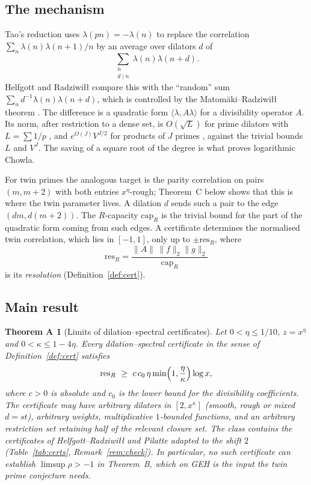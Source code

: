 \documentclass[11pt]{amsart}
\newtheorem*{theoremA}{Theorem A}
\theoremstyle{definition}
\theoremstyle{remark}
\newcommand{\res}{\mathrm{res}}
\newcommand{\capR}{\mathrm{cap}}
\begin{document}


\subsection{The mechanism}
Tao's reduction \cite{Tao16} uses $\lambda(pn)=-\lambda(n)$ to replace the correlation $\sum_n\lambda(n)\lambda(n+1)/n$ by an average over dilators $d$ of
\[
\sum_{\substack{n\\ d\mid n}}\lambda(n)\lambda(n+d).
\]
Helfgott and Radziwi\l{}\l{} compare this with the ``random'' sum $\sum_nd^{-1}\lambda(n)\lambda(n+d)$, which is controlled by the Matomäki--Radziwi\l{}\l{} theorem \cite{MR16}. The difference is a quadratic form $\langle\lambda,A\lambda\rangle$ for a divisibility operator $A$. Its norm, after restriction to a dense set, is $O(\sqrt L)$ for prime dilators with $L=\sum1/p$ \cite{HR21}, and $e^{O(J)}V^{J/2}$ for products of $J$ primes \cite{Pil23}, against the trivial bounds $L$ and $V^J$. The saving of a square root of the degree is what proves logarithmic Chowla.

For twin primes the analogous target is the parity correlation on pairs $(m,m+2)$ with both entries $x^\eta$-rough; Theorem~C below shows that this is where the twin parameter lives. A dilation $d$ sends such a pair to the edge $(dm,d(m+2))$. The $R$-capacity $\capR_R$ is the trivial bound for the part of the quadratic form coming from such edges. A certificate determines the normalised twin correlation, which lies in $[-1,1]$, only up to $\pm\res_R$, where
\[
\res_R=\frac{\|A\|\,\|f\|_2\|g\|_2}{\capR_R}
\]
is its \emph{resolution} (Definition~\ref{def:cert}).

\subsection{Main result}
\begin{theoremA}[Limits of dilation--spectral certificates]
Let $0<\eta\le1/10$, $z=x^\eta$ and $0<\kappa\le1-4\eta$. Every dilation--spectral certificate in the sense of Definition~\ref{def:cert} satisfies
\[
\res_R\ \ge\ c\,c_0\,\eta\min\Bigl(1,\frac\eta\kappa\Bigr)\log x,
\]
where $c>0$ is absolute and $c_0$ is the lower bound for the divisibility coefficients. The certificate may have arbitrary dilators in $[2,x^\kappa]$ (smooth, rough or mixed $d=st$), arbitrary weights, multiplicative $1$-bounded functions, and an arbitrary restriction set retaining half of the relevant closure set. The class contains the certificates of Helfgott--Radziwi\l{}\l{} and Pilatte adapted to the shift $2$ (Table~\ref{tab:certs}, Remark~\ref{rem:check}). In particular, no such certificate can establish $\limsup\rho>-1$ in Theorem~B, which on GEH is the input the twin prime conjecture needs.
\end{theoremA}
\end{document}
